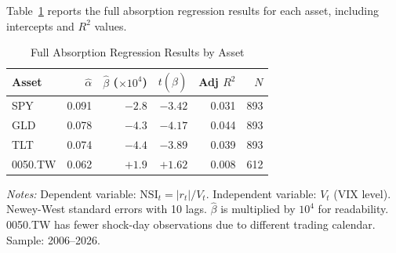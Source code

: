 \documentclass[12pt,a4paper]{article}
\begin{document}
Table~\ref{tab:cross_asset_detail} reports the full absorption regression results for each asset, including intercepts and $R^2$ values.

\begin{table}[H]
\centering
\caption{Full Absorption Regression Results by Asset}
\label{tab:cross_asset_detail}
\begin{threeparttable}
\begin{tabular}{lrrrrr}
\toprule
Asset & $\hat{\alpha}$ & $\hat{\beta}$ ($\times 10^4$) & $t(\hat{\beta})$ & Adj $R^2$ & $N$ \\
\midrule
SPY     & 0.091 & $-2.8$ & $-3.42$ & 0.031 & 893 \\
GLD     & 0.078 & $-4.3$ & $-4.17$ & 0.044 & 893 \\
TLT     & 0.074 & $-4.4$ & $-3.89$ & 0.039 & 893 \\
0050.TW & 0.062 & $+1.9$ & $+1.62$ & 0.008 & 612 \\
\bottomrule
\end{tabular}
\begin{tablenotes}
\small
\item \textit{Notes:} Dependent variable: $\text{NSI}_t = |r_t| / V_t$. Independent variable: $V_t$ (VIX level). Newey-West standard errors with 10 lags. $\hat{\beta}$ is multiplied by $10^4$ for readability. 0050.TW has fewer shock-day observations due to different trading calendar. Sample: 2006--2026.
\end{tablenotes}
\end{threeparttable}
\end{table}
\end{document}

